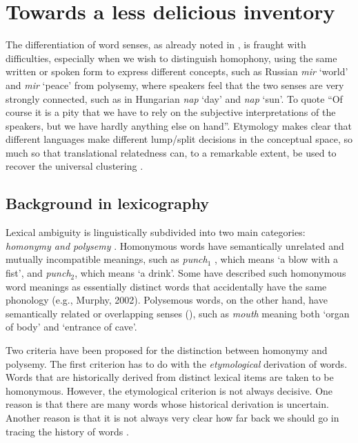 \documentclass[11pt]{article}
\begin{document}
\section{%
  Towards a less delicious 
  inventory}

The differentiation of word senses, as already noted in \cite{Borbely:2016}, is
fraught with difficulties, especially when we wish to distinguish homophony,
using the same written or spoken form to express different concepts, such as
Russian {\it mir} `world' and {\it mir} `peace' from polysemy, where speakers
feel that the two senses are very strongly connected, such as in Hungarian {\it
nap} `day' and {\it nap} `sun'.  To quote \cite{Zgusta:1971} ``Of course it is
a pity that we have to rely on the subjective interpretations of the speakers,
but we have hardly anything else on hand''. Etymology makes clear that
different languages make different lump/split decisions in the conceptual
space, so much so that translational relatedness can, to a remarkable extent,
be used to recover the universal clustering \citep{Youn:2016}.

\subsection{Background in lexicography}

Lexical ambiguity is linguistically subdivided into two main categories:
\emph{homonymy and polysemy} \citep{Cruse:2004}. Homonymous words have
semantically unrelated and mutually incompatible meanings, such as
\emph{punch$_1$} , which means `a blow with a fist', and \emph{punch$_2$},
which means `a drink'. Some have described such homonymous word meanings as
essentially distinct words that accidentally have the same phonology (e.g.,
Murphy, 2002). Polysemous words, on the other hand, have semantically related
or overlapping senses (\cite{Cruse:2004,Jackendoff:2002, Pustejovsky:1995}),
such as \emph{mouth} meaning both `organ of body' and `entrance of cave'.

Two criteria have been proposed for the distinction between homonymy and
polysemy. The first criterion has to do with the \emph{etymological} derivation
of words. Words that are historically derived from distinct lexical items are
taken to be homonymous. However, the etymological criterion is not always
decisive. One reason is that there are many words whose historical derivation
is uncertain. Another reason is that it is not always very clear how far back
we should go in tracing the history of words \citep{Lyons:1977}.  
\end{document}
